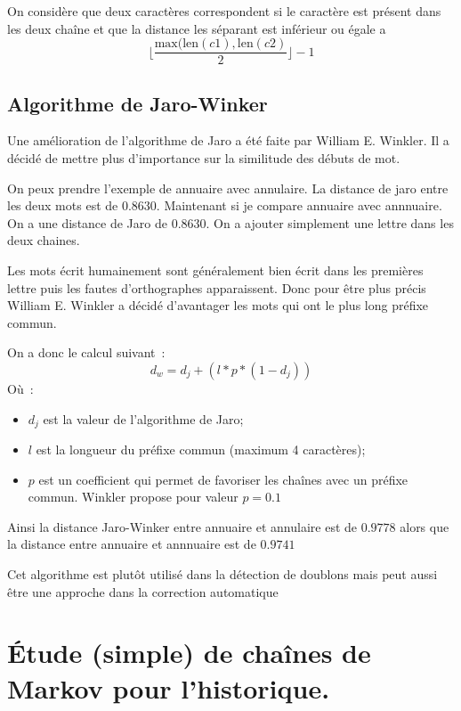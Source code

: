 \documentclass[final, 10pt]{report}
\begin{document}
    \medskip
    On considère que deux caractères correspondent si le caractère est présent dans les deux chaîne et que la distance les séparant est inférieur ou égale a $$\lfloor\frac{\text{max}(\text{len}(c1), \text{len}(c2)}{2}\rfloor -1$$
    
\section{Algorithme de Jaro-Winker\cite{noauthor_distance_2021}}

    Une amélioration de l'algorithme de Jaro a été faite par William E. Winkler.
    Il a décidé de mettre plus d'importance sur la similitude des débuts de mot.
    
    On peux prendre l'exemple de \fg annuaire\og{} avec \fg annulaire\og{}. 
    La distance de jaro entre les deux mots est de $0.8630$.
    Maintenant si je compare  \fg annuaire\og{} avec \fg annnuaire\og{}.
    On a une distance de Jaro de $0.8630$.
    On a ajouter simplement une lettre dans les deux chaines.
    
    Les mots écrit humainement sont généralement bien écrit dans les premières lettre puis les fautes d'orthographes apparaissent.
    Donc pour être plus précis William E. Winkler a décidé d'avantager les mots qui ont le plus long préfixe commun.
    
    
    On a donc le calcul suivant~:
    $$ d_w = d_j +(l * p * (1-d_j) )$$
    Où~:
    \begin{itemize}
        \item $d_j$ est la valeur de l'algorithme de Jaro;
        \item $l$ est la longueur du préfixe commun (maximum 4 caractères);
        \item $p$ est un coefficient qui permet de favoriser les chaînes avec un préfixe commun.
        Winkler propose pour valeur $p=0.1$
    \end{itemize}
    
    Ainsi la distance Jaro-Winker entre \fg annuaire\og{} et \fg annulaire\og{} est de $0.9778$ alors que la distance entre \fg annuaire\og{} et \fg annnuaire\og{} est de $0.9741$
    
    Cet algorithme est plutôt utilisé dans la détection de doublons mais peut aussi être une approche dans la correction automatique
    
\chapter{Étude (simple) de chaînes de Markov pour l’historique.}
\end{document}
